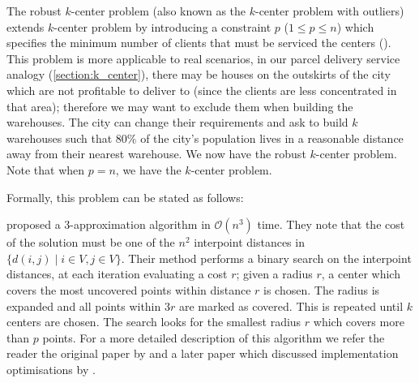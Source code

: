 The robust $k$-center problem (also known as the $k$-center problem with outliers) extends $k$-center problem by introducing a constraint \(p\) (\(1 \leq p \leq n \)) which specifies the minimum number of clients that must be serviced the centers (\cite{charikar_algorithms_2001}). This problem is more applicable to real scenarios, in our parcel delivery service analogy (\cref{section:k_center}), there may be houses on the outskirts of the city which are not profitable to deliver to (since the clients are less concentrated in that area); therefore we may want to exclude them when building the warehouses. The city can change their requirements and ask to build $k$ warehouses such that 80\% of the city's population lives in a reasonable distance away from their nearest warehouse. We now have the robust $k$-center problem. Note that when \(p=n\), we have the $k$-center problem.

Formally, this problem can be stated as follows:


\citeauthor{charikar_algorithms_2001} proposed a 3-approximation algorithm in $\mathcal{O}(n^{3})$ time. They note that the cost of the solution must be one of the $n^{2}$ interpoint distances in $\{d(i,j)\mid i\in V, j\in V\}$. Their method performs a binary search on the interpoint distances, at each iteration evaluating a cost $r$; given a radius $r$, a center which covers the most uncovered points within distance $r$ is chosen. The radius is expanded and all points within $3r$ are marked as covered. This is repeated until $k$ centers are chosen. The search looks for the smallest radius $r$ which covers more than $p$ points. For a more detailed description of this algorithm we refer the reader the original paper by \textcite{charikar_algorithms_2001} and a later paper which discussed implementation optimisations by \textcite{schwartz_efficient_2010}.
